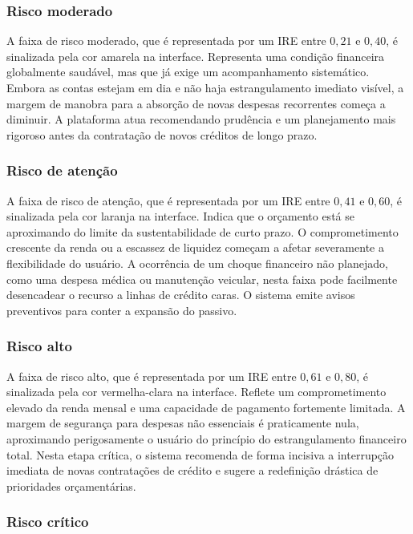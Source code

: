 \documentclass[portuguese]{sbc2025}%
\begin{document}
\subsubsection{Risco moderado}

A faixa de risco moderado, que é representada por um IRE entre $0{,}21$ e $0{,}40$, é sinalizada pela cor amarela na interface. Representa uma condição financeira globalmente saudável, mas que já exige um acompanhamento sistemático. Embora as contas estejam em dia e não haja estrangulamento imediato visível, a margem de manobra para a absorção de novas despesas recorrentes começa a diminuir. A plataforma atua recomendando prudência e um planejamento mais rigoroso antes da contratação de novos créditos de longo prazo.

\subsubsection{Risco de atenção}

A faixa de risco de atenção, que é representada por um IRE entre $0{,}41$ e $0{,}60$, é sinalizada pela cor laranja na interface. Indica que o orçamento está se aproximando do limite da sustentabilidade de curto prazo. O comprometimento crescente da renda ou a escassez de liquidez começam a afetar severamente a flexibilidade do usuário. A ocorrência de um choque financeiro não planejado, como uma despesa médica ou manutenção veicular, nesta faixa pode facilmente desencadear o recurso a linhas de crédito caras. O sistema emite avisos preventivos para conter a expansão do passivo.

\subsubsection{Risco alto}

A faixa de risco alto, que é representada por um IRE entre $0{,}61$ e $0{,}80$, é sinalizada pela cor vermelha-clara na interface. Reflete um comprometimento elevado da renda mensal e uma capacidade de pagamento fortemente limitada. A margem de segurança para despesas não essenciais é praticamente nula, aproximando perigosamente o usuário do princípio do estrangulamento financeiro total. Nesta etapa crítica, o sistema recomenda de forma incisiva a interrupção imediata de novas contratações de crédito e sugere a redefinição drástica de prioridades orçamentárias.

\subsubsection{Risco crítico}
\end{document}
